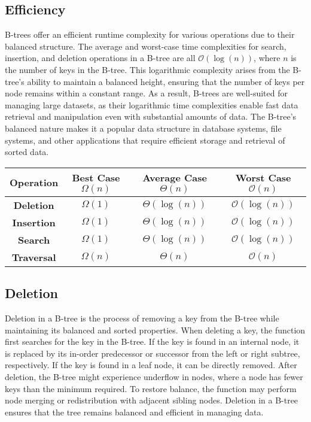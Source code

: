 \subsection*{Efficiency}

B-trees offer an efficient runtime complexity for various operations due to their balanced structure. The average and worst-case time complexities for search, insertion, and deletion operations in a B-tree 
are all $\mathcal{O}(\log{(n)})$, where $n$ is the number of keys in the B-tree. This logarithmic complexity arises from the B-tree's ability to maintain a balanced height, ensuring that the number of keys 
per node remains within a constant range. As a result, B-trees are well-suited for managing large datasets, as their logarithmic time complexities enable fast data retrieval and manipulation even with 
substantial amounts of data. The B-tree's balanced nature makes it a popular data structure in database systems, file systems, and other applications that require efficient storage and retrieval of sorted data.

\begin{center}
    \begin{tabular}[ht]{|c|c|c|c|}
        \hline \textbf{Operation} & \textbf{Best Case $\Omega(n)$} & \textbf{Average Case $\Theta(n)$} & \textbf{Worst Case $\mathcal{O}(n)$} \\ \hline
        \textbf{Deletion} & $\Omega(1)$ & $\Theta(\log{(n)})$ & $\mathcal{O}(\log{(n)})$ \\ \hline
        \textbf{Insertion} & $\Omega(1)$ & $\Theta(\log{(n)})$ & $\mathcal{O}(\log{(n)})$ \\ \hline
        \textbf{Search} & $\Omega(1)$ & $\Theta(\log{(n)})$ & $\mathcal{O}(\log{(n)})$ \\ \hline
        \textbf{Traversal} & $\Omega(n)$ & $\Theta(n)$ & $\mathcal{O}(n)$ \\ \hline
    \end{tabular}
\end{center}

\subsection*{Deletion}

Deletion in a B-tree is the process of removing a key from the B-tree while maintaining its balanced and sorted properties. When deleting a key, the function first searches for the key in the B-tree. If the key 
is found in an internal node, it is replaced by its in-order predecessor or successor from the left or right subtree, respectively. If the key is found in a leaf node, it can be directly removed. After deletion, 
the B-tree might experience underflow in nodes, where a node has fewer keys than the minimum required. To restore balance, the function may perform node merging or redistribution with adjacent sibling nodes. 
Deletion in a B-tree ensures that the tree remains balanced and efficient in managing data.

